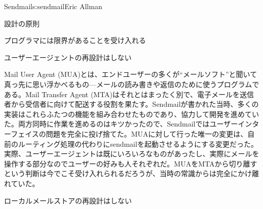 \begin{aosachapter}{Sendmail}{s:sendmail}{Eric Allman}
\begin{aosasect1}{設計の原則}
\begin{aosasect2}{プログラマには限界があることを受け入れる}
\end{aosasect2}

\begin{aosasect2}{ユーザーエージェントの再設計はしない}

Mail User Agent (MUA)とは、エンドユーザーの多くが``メールソフト''と聞いて真っ先に思い浮かべるもの---メールの読み書きや返信のために使うプログラムである。Mail Transfer Agent (MTA)はそれとはまったく別で、電子メールを送信者から受信者に向けて配送する役割を果たす。Sendmailが書かれた当時、多くの実装はこれらふたつの機能を組み合わせたものであり、協力して開発を進めていた。両方同時に作業を進めるのはキツかったので、Sendmailではユーザーインターフェイスの問題を完全に投げ捨てた。MUAに対して行った唯一の変更は、自前のルーティング処理の代わりにsendmailを起動させるようにする変更だった。実際、ユーザーエージェントは既にいろいろなものがあったし、実際にメールを操作する部分なのでユーザーの好みも人それぞれだ。MUAをMTAから切り離すという判断は今でこそ受け入れられるだろうが、当時の常識からは完全にかけ離れていた。

\end{aosasect2}

\begin{aosasect2}{ローカルメールストアの再設計はしない}


\end{aosasect2}
\end{aosasect1}
\end{aosachapter}
